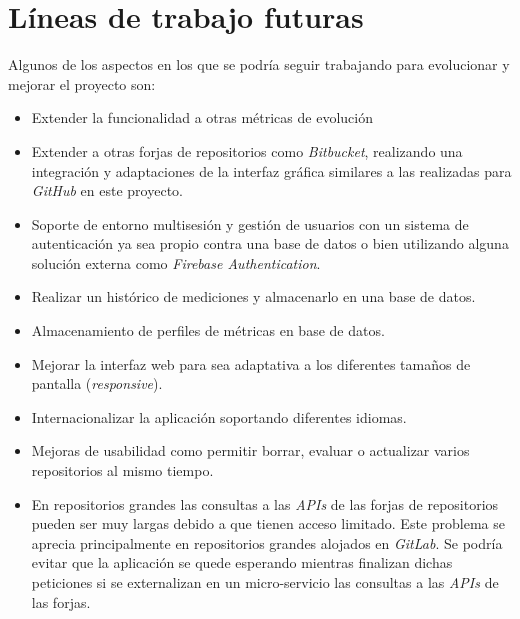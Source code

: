 \section{Líneas de trabajo futuras}
Algunos de los aspectos en los que se podría seguir trabajando para evolucionar y mejorar el proyecto son:\\
\begin{itemize}
	\item Extender la funcionalidad a otras métricas de evolución
	\item Extender a otras forjas de repositorios como \textit{Bitbucket}, realizando una integración y adaptaciones de la interfaz gráfica similares a las realizadas para \textit{GitHub} en este proyecto.
	\item Soporte de entorno multisesión y gestión de usuarios con un sistema de autenticación ya sea propio contra una base de datos o bien utilizando alguna solución externa como \textit{Firebase Authentication}.
	\item Realizar un histórico de mediciones y almacenarlo en una base de datos.
	\item Almacenamiento de perfiles de métricas en base de datos.
	\item Mejorar la interfaz web para sea adaptativa a los diferentes tamaños de pantalla (\textit{responsive}).
	\item Internacionalizar la aplicación soportando diferentes idiomas.
	\item Mejoras de usabilidad como permitir borrar, evaluar o actualizar varios repositorios al mismo tiempo.
	\item En repositorios grandes las consultas a las \textit{APIs} de las forjas de repositorios pueden ser muy largas debido a que tienen acceso limitado. Este problema se aprecia principalmente en repositorios grandes alojados en \textit{GitLab}. Se podría evitar que la aplicación se quede esperando mientras finalizan dichas peticiones si se externalizan en un micro-servicio las consultas a las \textit{APIs} de las forjas.
	
\end{itemize}